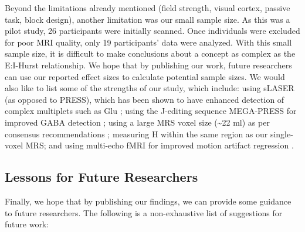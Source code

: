 \documentclass[
true
]{sn-jnl}
\begin{document}
Beyond the limitations already mentioned (field strength, visual cortex,
passive task, block design), another limitation was our small sample
size. As this was a pilot study, 26 participants were initially scanned.
Once individuals were excluded for poor MRI quality, only 19
participants' data were analyzed. With this small sample size, it is
difficult to make conclusions about a concept as complex as the
E:I-Hurst relationship. We hope that by publishing our work, future
researchers can use our reported effect sizes to calculate potential
sample sizes. We would also like to list some of the strengths of our
study, which include: using sLASER (as opposed to PRESS), which has been
shown to have enhanced detection of complex multiplets such as Glu
\citep{wilsonMethodologicalConsensusClinical2019}; using the J-editing
sequence MEGA-PRESS for improved GABA detection
\citep{peekComprehensiveGuideMEGAPRESS2023}; using a large MRS voxel
size (\textasciitilde22 ml) as per consensus recommendations
\citep{peekBrainGABAGlutamate2020, choiSpectralEditing1H2021, linMinimumReportingStandards2021};
measuring H within the same region as our single-voxel MRS; and using
multi-echo fMRI for improved motion artifact regression
\citep{kunduMultiechoFMRIReview2017}.

\subsection{Lessons for Future
Researchers}\label{lessons-for-future-researchers}

Finally, we hope that by publishing our findings, we can provide some
guidance to future researchers. The following is a non-exhaustive list
of suggestions for future work:
\end{document}
